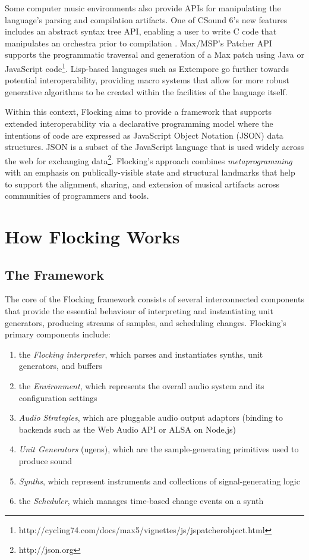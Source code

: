\documentclass{article}
\begin{document}
Some computer music environments also provide APIs for manipulating the language's parsing and compilation artifacts. One of CSound 6's new features includes an abstract syntax tree API, enabling a user to write C code that manipulates an orchestra prior to compilation \cite{fitch2013Csound6}. Max/MSP's Patcher API supports the programmatic traversal and generation of a Max patch using Java or JavaScript code\footnote{http://cycling74.com/docs/max5/vignettes/js/jspatcherobject.html}. Lisp-based languages such as Extempore go further towards potential interoperability, providing macro systems that allow for more robust generative algorithms to be created within the facilities of the language itself.

Within this context, Flocking aims to provide a framework that supports extended interoperability via a declarative programming model where the intentions of code are expressed as JavaScript Object Notation (JSON) data structures. JSON is a subset of the JavaScript language that is used widely across the web for exchanging data\footnote{http://json.org}. Flocking's approach combines {\it metaprogramming} with an emphasis on publically-visible state and structural landmarks that help to support the alignment, sharing, and extension of musical artifacts across communities of programmers and tools.

\section{How Flocking Works}

\subsection{The Framework}

The core of the Flocking framework consists of several interconnected components that provide the essential behaviour of interpreting and instantiating unit generators, producing streams of samples, and scheduling changes. Flocking's primary components include:

\begin{enumerate}
\item the {\it Flocking interpreter}, which parses and instantiates synths, unit generators, and buffers
\item the {\it Environment}, which represents the overall audio system and its configuration settings
\item {\it Audio Strategies}, which are pluggable audio output adaptors (binding to backends such as the Web Audio API or ALSA on Node.js)
\item {\it Unit Generators} (ugens), which are the sample-generating primitives used to produce sound
\item {\it Synths}, which represent instruments and collections of signal-generating logic
\item the {\it Scheduler}, which manages time-based change events on a synth
\end{enumerate}
\end{document}

